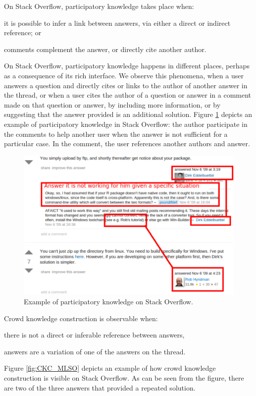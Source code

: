     On Stack Overflow, participatory knowledge takes place when:
    \begin{enumerate*}[label=(\arabic*)]
    \item it is possible to infer a link between answers, via either a direct or indirect reference; or
    \item comments complement the answer, or directly cite another author.
    \end{enumerate*}

    On Stack Overflow, participatory knowledge happens in different places, perhaps as a consequence of its rich interface.
    We observe this phenomena, when a user answers a question and directly cites or links to the author of another answer in the thread, or when a user cites the author of a question or answer in a comment made on that question or answer, by including more information, or by suggesting that the answer provided is an additional solution.
    Figure \ref{fig:SO-PK1} depicts an example of participatory knowledge in Stack Overflow: the author participate in the comments to help another user when the answer is not sufficient for a particular case.
    In the comment, the user references another authors and answer.

    \begin{figure}[!htb]
        \centering
        \includegraphics[width=\columnwidth]{Figures/SO-PKimg5}
        \caption{Example of participatory knowledge on Stack Overflow.}
        \label{fig:SO-PK1}
    \end{figure}

    Crowd knowledge construction is observable when:
    \begin{enumerate*}[label=(\arabic*)]
    \item there is not a direct or inferable reference between answers,
    \item answers are a variation of one of the answers on the thread.
    \end{enumerate*}
    Figure \ref{fig:CKC_MLSO} depicts an example of how crowd knowledge construction is visible on Stack Overflow.
    As can be seen from the figure, there are two of the three answers that provided a repeated solution.


